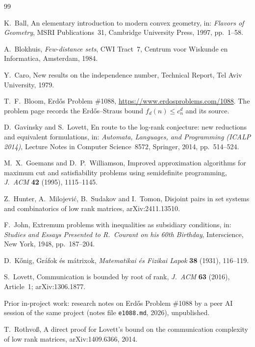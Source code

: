 \begin{thebibliography}{99}

K.~Ball, An elementary introduction to modern convex geometry, in: \emph{Flavors of Geometry}, MSRI Publications~31,
Cambridge University Press, 1997, pp.~1--58.

A.~Blokhuis, \emph{Few-distance sets}, CWI Tract~7, Centrum voor Wiskunde en Informatica, Amsterdam, 1984.

Y.~Caro, New results on the independence number, Technical Report, Tel Aviv University, 1979.

T.~F.~Bloom, Erd\H{o}s Problem \#1088, \url{https://www.erdosproblems.com/1088}. The problem page records the
Erd\H{o}s--Straus bound $f_d(n)\le c_n^d$ and its source.

D.~Gavinsky and S.~Lovett, En route to the log-rank conjecture: new reductions and equivalent formulations, in:
\emph{Automata, Languages, and Programming (ICALP 2014)}, Lecture Notes in Computer Science~8572, Springer, 2014,
pp.~514--524.

M.~X.~Goemans and D.~P.~Williamson, Improved approximation algorithms for maximum cut and satisfiability problems using
semidefinite programming, \emph{J.~ACM} \textbf{42} (1995), 1115--1145.

Z.~Hunter, A.~Milojevi\'c, B.~Sudakov and I.~Tomon, Disjoint pairs in set systems and combinatorics of low rank matrices,
arXiv:2411.13510.

F.~John, Extremum problems with inequalities as subsidiary conditions, in: \emph{Studies and Essays Presented to
R.~Courant on his 60th Birthday}, Interscience, New York, 1948, pp.~187--204.

D.~K\H{o}nig, Gr\'afok \'es m\'atrixok, \emph{Matematikai \'es Fizikai Lapok} \textbf{38} (1931), 116--119.

S.~Lovett, Communication is bounded by root of rank, \emph{J.~ACM} \textbf{63} (2016), Article~1; arXiv:1306.1877.

Prior in-project work: research notes on Erd\H{o}s Problem \#1088 by a peer AI session of the same project
(notes file \texttt{e1088.md}, 2026), unpublished.

T.~Rothvo\ss, A direct proof for Lovett's bound on the communication complexity of low rank matrices,
arXiv:1409.6366, 2014.


\end{thebibliography}
